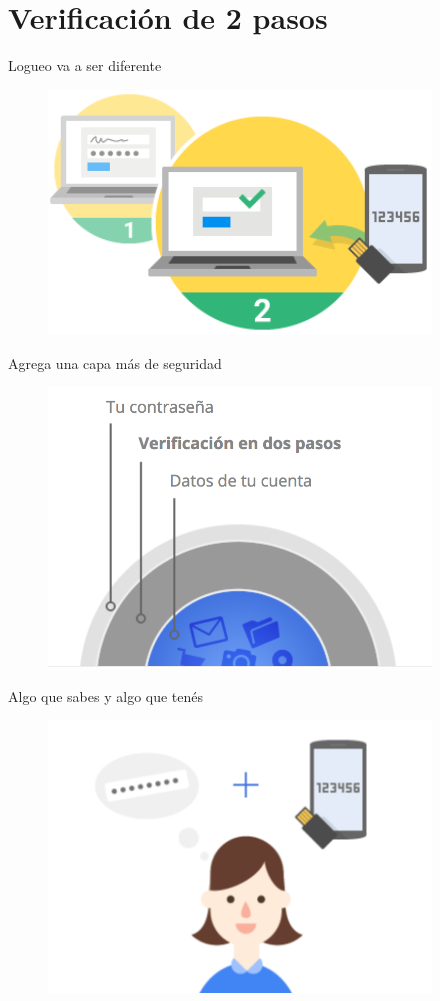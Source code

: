 \documentclass[11pt]{beamer}
\begin{document}
\section{Verificaci\'on de 2 pasos}
\begin{frame}{Logueo va a ser diferente}
  \begin{figure}
    \includegraphics[width=4in]{images/how-works-img-1.png}
  \end{figure}
\end{frame}
\begin{frame}{Agrega una capa m\'as de seguridad}
  \begin{figure}
    \includegraphics[width=4in]{images/unacapamas.png}
  \end{figure}
\end{frame}
\begin{frame}{Algo que sabes y algo que ten\'es}
  \begin{figure}
    \includegraphics[width=4in]{images/algoqsabesyalgoqtenes.png}
  \end{figure}
\end{frame}
\end{document}
